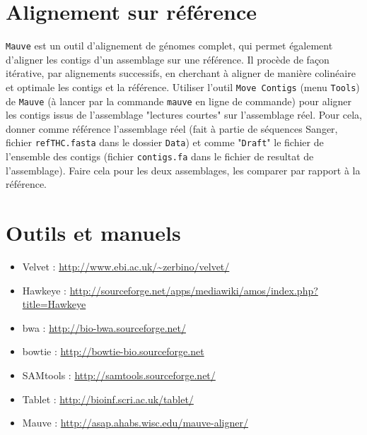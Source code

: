 \documentclass[a4paper,12pt]{article}
\begin{document}
\section{Alignement sur référence}
\verb=Mauve= est un outil d'alignement de génomes complet, qui permet également d'aligner les contigs d'un assemblage sur une référence. Il procède de façon itérative, par alignements successifs, en cherchant à aligner de manière colinéaire et optimale les contigs et la référence.
Utiliser l'outil \verb=Move Contigs= (menu \verb=Tools=) de \verb=Mauve= (à lancer par la commande \verb=mauve= en ligne de commande) pour aligner les contigs issus de l'assemblage "lectures courtes" sur l'assemblage réel. Pour cela, donner comme référence l'assemblage réel (fait à partie de séquences Sanger, fichier \verb=refTHC.fasta= dans le dossier \verb=Data=) et comme "\verb=Draft=" le fichier de l'ensemble des contigs (fichier \verb=contigs.fa= dans le fichier de resultat de l'assemblage). Faire cela pour les deux assemblages, les comparer par rapport à la référence. 

\section{Outils et manuels}

\begin{itemize}
	\item Velvet : \url{http://www.ebi.ac.uk/~zerbino/velvet/}
	\item Hawkeye : \url{http://sourceforge.net/apps/mediawiki/amos/index.php?title=Hawkeye}
	\item bwa : \url{http://bio-bwa.sourceforge.net/}
	\item bowtie : \url{http://bowtie-bio.sourceforge.net}
	\item SAMtools : \url{http://samtools.sourceforge.net/}
	\item Tablet : \url{http://bioinf.scri.ac.uk/tablet/}
	\item Mauve : \url{http://asap.ahabs.wisc.edu/mauve-aligner/}
	
\end{itemize}

{}

\end{document}
